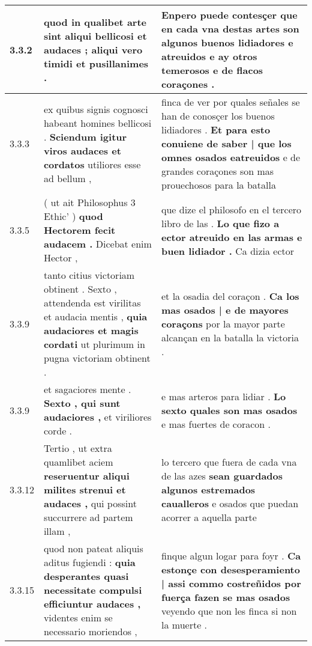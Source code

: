 \begin{tabular}{|p{1cm}|p{6.5cm}|p{6.5cm}|}
3.3.2 & quod in qualibet arte sint \textbf{ aliqui bellicosi et audaces ; } aliqui vero timidi et pusillanimes . & Enpero puede contesçer \textbf{ que en cada vna destas artes son algunos buenos lidiadores e atreuidos } e ay otros temerosos e de flacos coraçones . \\\hline
3.3.3 & ex quibus signis cognosci habeant homines bellicosi . \textbf{ Sciendum igitur viros audaces et cordatos } utiliores esse ad bellum , & finca de ver por quales señales se han de conosçer los buenos lidiadores . \textbf{ Et para esto conuiene de saber | que los omnes osados eatreuidos } e de grandes coraçones son mas prouechosos para la batalla \\\hline
3.3.5 & ( ut ait Philosophus 3 Ethic’ ) \textbf{ quod Hectorem fecit audacem . } Dicebat enim Hector , & que dize el philosofo en el tercero libro de las . \textbf{ Lo que fizo a ector atreuido en las armas e buen lidiador . } Ca dizia ector \\\hline
3.3.9 & tanto citius victoriam obtinent . Sexto , attendenda est virilitas et audacia mentis , \textbf{ quia audaciores et magis cordati } ut plurimum in pugna victoriam obtinent . & et la osadia del coraçon . \textbf{ Ca los mas osados | e de mayores coraçons } por la mayor parte alcançan en la batalla la victoria . \\\hline
3.3.9 & et sagaciores mente . \textbf{ Sexto , qui sunt audaciores , } et viriliores corde . & e mas arteros para lidiar . \textbf{ Lo sexto quales son mas osados } e mas fuertes de coracon . \\\hline
3.3.12 & Tertio , ut extra quamlibet aciem \textbf{ reseruentur aliqui milites strenui et audaces , } qui possint succurrere ad partem illam , & lo tercero que fuera de cada vna de las azes \textbf{ sean guardados algunos estremados caualleros } e osados que puedan acorrer a aquella parte \\\hline
3.3.15 & quod non pateat aliquis aditus fugiendi : \textbf{ quia desperantes quasi necessitate compulsi efficiuntur audaces , } videntes enim se necessario moriendos , & finque algun logar para foyr . \textbf{ Ca estonçe con desesperamiento | assi commo costreñidos por fuerça fazen se mas osados } veyendo que non les finca si non la muerte . \\\hline

\end{tabular}
